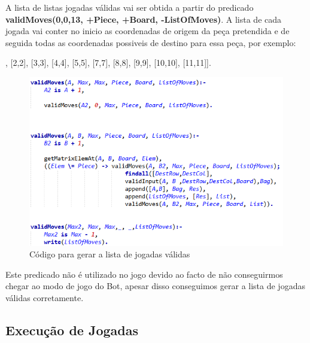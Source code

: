 \documentclass[a4paper]{article}
\begin{document}
\par A lista de listas jogadas válidas vai ser obtida a partir do predicado \textbf{validMoves(0,0,13, +Piece, +Board, -ListOfMoves)}. A lista de cada jogada vai conter no inicio as coordenadas de origem da peça pretendida e de seguida todas as coordenadas possiveis de destino para essa peça, por exemplo: 
\par [ [0, 0, [1,1], [2,2], [3,3], [4,4], [5,5], [7,7], [8,8], [9,9], [10,10], [11,11]]. 
\begin{figure}[h!]

\hspace*{-0.5cm}\includegraphics[scale=0.85]{listajogadas.png}
\caption{Código para gerar a lista de jogadas válidas}

\end{figure}

\par Este predicado não é utilizado no jogo devido ao facto de não conseguirmos chegar ao modo de jogo do Bot, apesar disso conseguimos gerar a lista de jogadas válidas corretamente.
\subsection{Execução de Jogadas}
\end{document}
